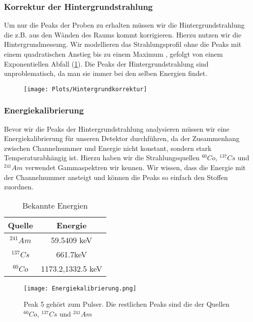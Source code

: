 \documentclass[]{article}
\begin{document}
\subsubsection{Korrektur der Hintergrundstrahlung}
Um nur die Peaks der Proben zu erhalten müssen wir die Hintergrundstrahlung die z.B. aus den Wänden des Raums kommt korrigieren. Hierzu nutzen wir die Hintergrundmessung. Wir modellieren das Strahlungsprofil ohne die Peaks mit einem quadratischen Anstieg bis zu einem Maximum , gefolgt von einem Exponentiellen Abfall (\ref{fig:hintergrundkorrektur}). Die Peaks der Hintergrundstrahlung sind unproblematisch, da man sie immer bei den selben Energien findet.

\begin{figure}
	\centering
	\texttt{[image: Plots/Hintergrundkorrektur]}
	\caption{}
	\label{fig:hintergrundkorrektur}
\end{figure}

\subsubsection{Energiekalibrierung}
Bevor wir die Peaks der Hintergrundstrahlung analysieren müssen wir eine Energiekalibrierung für unseren Detektor durchführen, da der Zusammenhang zwischen Channelnummer und Energie nicht konstant, sondern stark Temperaturabhängig ist. Hierzu haben wir die Strahlungsquellen $^{60}Co$, $^{137}Cs$ und $^{241}Am$ verwendet Gammaspektren wir kennen. Wir wissen, dass die Energie mit der Channelnummer ansteigt und können die Peaks so einfach den Stoffen zuordnen.

\begin{table}[H]
\caption{Bekannte Energien}
\centering
	\begin{tabular}{|c|c|}
	
		\hline
		Quelle & Energie \\
		\hline 
		$^{241}Am$ & 59.5409 keV \\ 
		\hline 
		$^{137}Cs$ & 661.7keV \\ 
		\hline 
		$^{60}Co$ &  1173.2,1332.5 keV\\ 
		\hline 

	\end{tabular} 
\end{table}
\begin{figure}
	\centering
	\texttt{[image: Energiekalibrierung.png]}
	\caption{Peak 5 gehört zum Pulser. Die restlichen Peaks sind die der Quellen  $^{60}Co$, $^{137}Cs$ und $^{241}Am$}
	\label{fig:hintergrund}
\end{figure}
\end{document}
